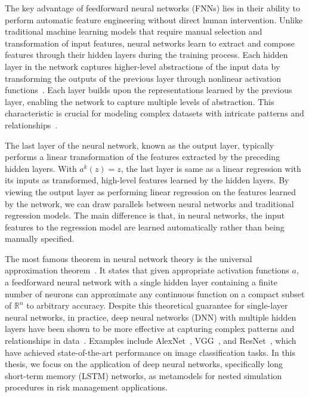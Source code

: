 The key advantage of feedforward neural networks (FNNs) lies in their ability to perform automatic feature engineering without direct human intervention. 
Unlike traditional machine learning models that require manual selection and transformation of input features, neural networks learn to extract and compose features through their hidden layers during the training process. 
Each hidden layer in the network captures higher-level abstractions of the input data by transforming the outputs of the previous layer through nonlinear activation functions~\citep{lecun2015deep}.
Each layer builds upon the representations learned by the previous layer, enabling the network to capture multiple levels of abstraction. This characteristic is crucial for modeling complex datasets with intricate patterns and relationships~\citep{bengio2013representation}.

The last layer of the neural network, known as the output layer, typically performs a linear transformation of the features extracted by the preceding hidden layers. 
With $a^{k}(z) = z$, the last layer is same as a linear regression with its inputs as transformed, high-level features learned by the hidden layers.
By viewing the output layer as performing linear regression on the features learned by the network, we can draw parallels between neural networks and traditional regression models. 
The main difference is that, in neural networks, the input features to the regression model are learned automatically rather than being manually specified.

The most famous theorem in neural network theory is the universal approximation theorem~\citep{hornik1989multilayer}.
It states that given appropriate activation functions $a$, a feedforward neural network with a single hidden layer containing a finite number of neurons can approximate any continuous function on a compact subset of $\mathbb{R}^n$ to arbitrary accuracy. 
Despite this theoretical guarantee for single-layer neural networks, in practice, deep neural networks (DNN) with multiple hidden layers have been shown to be more effective at capturing complex patterns and relationships in data~\citep{lecun2015deep}.
Examples include AlexNet~\citep{krizhevsky2012imagenet}, VGG~\citep{simonyan2014very}, and ResNet~\citep{he2016deep}, which have achieved state-of-the-art performance on image classification tasks.
In this thesis, we focus on the application of deep neural networks, specifically long short-term memory (LSTM) networks, as metamodels for nested simulation procedures in risk management applications.

